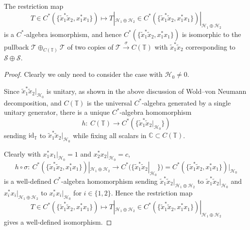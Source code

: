 \begin{theorem}\label{restriction} The restriction map
\[
T\in C^{\ast}( \{ \tilde{x}_{1}^{\ast}\tilde{x}_{2},x_{1}^{\ast
}x_{1} \} ) \mapsto T|_{\mathcal{H}_{1}\oplus\mathcal{H}_{2}}\in
C^{\ast}( \{ \tilde{x}_{1}^{\ast}\tilde{x}_{2},x_{1}^{\ast}%
x_{1} \} ) |_{\mathcal{H}_{1}\oplus\mathcal{H}_{2}}%
\]
is a $C^*$-algebra isomorphism, and hence $C^{\ast}( \{ \tilde{x}%
_{1}^{\ast}\tilde{x}_{2},x_{1}^{\ast}x_{1} \} ) $ is isomorphic
to the pullback $\mathcal{T}\oplus_{C(\mathbb{T}) }\mathcal{T}$
of two copies of $\mathcal{T}\overset{\sigma}{\rightarrow}C(
\mathbb{T}) $ with $\tilde{x}_{1}^{\ast}\tilde{x}_{2}$ corresponding to
$\mathcal{S}\oplus\mathcal{S}$.
\end{theorem}
\begin{proof} Clearly we only need to consider the case with $\mathcal{H}_{0}\neq0$.

Since $\tilde{x}_{1}^{\ast}\tilde{x}_{2}|_{\mathcal{H}_{0}}$ is unitary, as
shown in the above discussion of Wold--von Neumann decomposition, and $C(
\mathbb{T}) $ is the universal $C^*$-algebra generated by a single unitary
generator, there is a unique $C^*$-algebra homomorphism
\[
h\colon \ C(\mathbb{T}) \rightarrow C^{\ast}( \{ \tilde
{x}_{1}^{\ast}\tilde{x}_{2}|_{\mathcal{H}_{0}} \} )
\]
sending $\mathrm{id}_{\mathbb{T}}$ to $\tilde{x}_{1}^{\ast}\tilde{x}%
_{2}|_{\mathcal{H}_{0}}$ while fixing all scalars in $\mathbb{C}\subset
C(\mathbb{T}) $.

Clearly with $x_{1}^{\ast}x_{1}|_{\mathcal{H}_{0}}=1$ and $x_{2}^{\ast}%
x_{2}|_{\mathcal{H}_{0}}=c$,
\[
h\circ\sigma\colon \ C^{\ast}( \{ \tilde{x}_{1}^{\ast}\tilde{x}_{2}%
,x_{1}^{\ast}x_{1} \} ) |_{\mathcal{H}_{1}\oplus\mathcal{H}_{2}%
}\rightarrow C^{\ast}( \{ \tilde{x}_{1}^{\ast}\tilde{x}%
_{2}|_{\mathcal{H}_{0}} \} ) =C^{\ast}( \{ \tilde
{x}_{1}^{\ast}\tilde{x}_{2},x_{1}^{\ast}x_{1} \} ) |_{\mathcal{H}_{0}}
\]
is a well-defined $C^*$-algebra homomorphism sending $\tilde{x}_{1}^{\ast}%
\tilde{x}_{2}|_{\mathcal{H}_{1}\oplus\mathcal{H}_{2}}$ to $\tilde{x}_{1}%
^{\ast}\tilde{x}_{2}|_{\mathcal{H}_{0}}$ and $x_{i}^{\ast}x_{i}|_{\mathcal{H}%
_{1}\oplus\mathcal{H}_{2}}$ to $x_{i}^{\ast}x_{i}|_{\mathcal{H}_{0}}$ for
$i\in \{ 1,2 \} $. Hence the restriction map
\[
T\in C^{\ast}( \{ \tilde{x}_{1}^{\ast}\tilde{x}_{2},x_{1}^{\ast
}x_{1} \} ) \mapsto T|_{\mathcal{H}_{1}\oplus\mathcal{H}_{2}}\in
C^{\ast}( \{ \tilde{x}_{1}^{\ast}\tilde{x}_{2},x_{1}^{\ast}%
x_{1} \} ) |_{\mathcal{H}_{1}\oplus\mathcal{H}_{2}}
\]
gives a well-defined isomorphism.
\end{proof}

